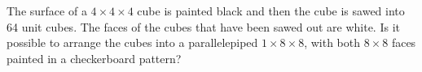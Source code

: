 \problem
The surface of a $4 \times 4 \times 4$ cube is painted black and then the cube
is sawed into 64 unit cubes.
The faces of the cubes that have been sawed out are white.
Is it possible to arrange the cubes into a parallelepiped
$1 \times 8 \times 8$, with both $8 \times 8$ faces painted in a checkerboard
pattern?
\solution
\endproblem
